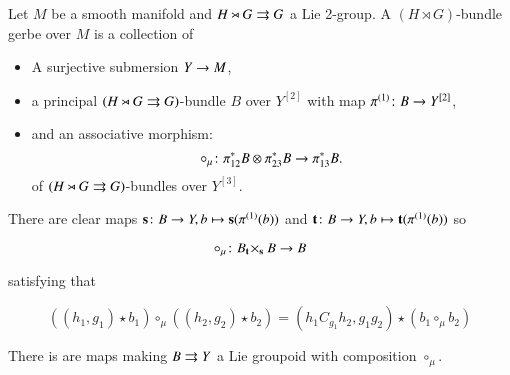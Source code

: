 	
\date{\today}

\maketitle

Let $M$ be a smooth manifold and $H\rtimes G\rightrightarrows G$ a Lie 2-group. A $(H\rtimes G)$-bundle gerbe over $M$ is a collection of 

\begin{itemize}
	\item A surjective submersion $ Y\rightarrow M$,
	\item a principal $(H\rtimes G\rightrightarrows G)$-bundle $B$ over $Y^{[2]}$ with map $\pi^{(1)}\colon B\rightarrow Y^{[2]}$,
	\item and an associative morphism:
	$$\circ_\mu \colon \pi_{12}^* B\otimes \pi_{23}^* B\rightarrow \pi^*_{13} B.$$
	of $(H\rtimes G\rightrightarrows G)$-bundles over $Y^{[3]}$.	
\end{itemize} 
There are clear maps $\mathbf{s}\colon B\rightarrow Y, b\mapsto \mathbf{s}(\pi^{(1)}(b))$ and $\mathbf{t}\colon B\rightarrow Y, b\mapsto \mathbf{t}(\pi^{(1)}(b))$ so 

$$\circ_\mu\colon B {}_{\mathbf{t}}\!\times_{\mathbf{s}} B \rightarrow B$$

satisfying that 

$$\left((h_1,g_1)\star b_1\right)\circ_\mu \left((h_2,g_2)\star b_2\right)=(h_1C_{g_1}h_2,g_1 g_2)\star (b_1\circ_\mu b_2)$$

\begin{prop}
	There is are maps making $B\rightrightarrows Y$ a Lie groupoid with composition $\circ_\mu$.
\end{prop}

